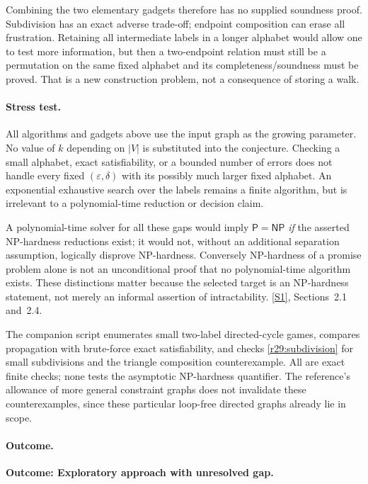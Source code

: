 \documentclass[11pt,a4paper]{article}
\newcommand{\sref}[2]{\hyperlink{source:#1:#2}{[S#2]}}
\numberwithin{equation}{section}
\begin{document}
Combining the two elementary gadgets therefore has no supplied
soundness proof. Subdivision has an exact adverse trade-off; endpoint
composition can erase all frustration. Retaining all intermediate labels
in a longer alphabet would allow one to test more information, but then
a two-endpoint relation must still be a permutation on the same fixed
alphabet and its completeness/soundness must be proved. That is a new
construction problem, not a consequence of storing a walk.

\paragraph{Stress test.}
All algorithms and gadgets above use the input graph as the growing
parameter. No value of $k$ depending on $|V|$ is substituted into the
conjecture. Checking a small alphabet, exact satisfiability, or a bounded
number of errors does not handle every fixed $(\varepsilon,\delta)$
with its possibly much larger fixed alphabet. An exponential exhaustive
search over the labels remains a finite algorithm, but is irrelevant to
a polynomial-time reduction or decision claim.

A polynomial-time solver for all these gaps would imply $\mathsf P=\mathsf{NP}$
\emph{if} the asserted NP-hardness reductions exist; it would not, without
an additional separation assumption, logically disprove NP-hardness.
Conversely NP-hardness of a promise problem alone is not an unconditional
proof that no polynomial-time algorithm exists. These distinctions matter
because the selected target is an NP-hardness statement, not merely an
informal assertion of intractability. \sref{statement}{1}, Sections~2.1 and~2.4.

The companion script enumerates small two-label directed-cycle games,
compares propagation with brute-force exact satisfiability, and checks
\eqref{r29:subdivision} for small subdivisions and the triangle
composition counterexample. All are exact finite checks; none tests the
asymptotic NP-hardness quantifier. The reference's allowance of more
general constraint graphs does not invalidate these counterexamples,
since these particular loop-free directed graphs already lie in scope.

\paragraph{Outcome.}
\textbf{Outcome: Exploratory approach with unresolved gap.}
\end{document}
